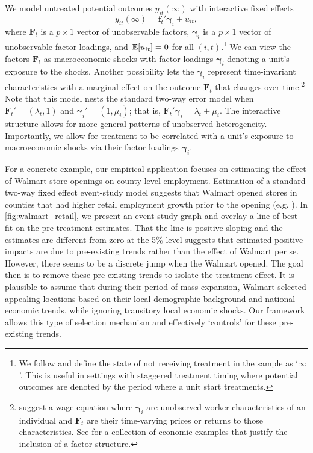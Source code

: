\documentclass[12pt]{article}
\begin{document}
We model untreated potential outcomes $y_{it}(\infty)$ with interactive fixed effects
\begin{equation}\label{eq:untreated_po}
    y_{it}(\infty) = \bm{f}_t' \bm{\gamma}_i + u_{it},
\end{equation}
where $\bm{F}_t$ is a $p \times 1$ vector of unobservable factors, $\bm \gamma_i$ is a $p \times 1$ vector of unobservable factor loadings, and $\expec{u_{it}} = 0$ for all $(i,t)$.\footnote{We follow \citet{Callaway_Santanna_2021} and define the state of not receiving treatment in the sample as `$\infty$'. This is useful in settings with staggered treatment timing where potential outcomes are denoted by the period where a unit start treatments.} We can view the factors $\bm{F}_t$ as macroeconomic shocks with factor loadings $\bm \gamma_i$ denoting a unit's exposure to the shocks. Another possibility lets the $\bm \gamma_i$ represent time-invariant characteristics with a marginal effect on the outcome $\bm{F}_t$ that changes over time.\footnote{\citet{Ahn_Lee_Schmidt_2013} suggest a wage equation where $\bm \gamma_i$ are unobserved worker characteristics of an individual and $\bm{F}_t$ are their time-varying prices or returns to those characteristics. See \citet{Bai_2009} for a collection of economic examples that justify the inclusion of a factor structure.} Note that this model nests the standard two-way error model when $\bm{F}_t' = (\lambda_t, 1)$ and $\bm \gamma_i' = (1, \mu_i)$; that is, $\bm{F}_t' \bm \gamma_i = \lambda_t + \mu_i$. The interactive structure allows for more general patterns of unobserved heterogeneity. Importantly, we allow for treatment to be correlated with a unit's exposure to macroeconomic shocks via their factor loadings $\bm{\gamma}_i$. 

For a concrete example, our empirical application focuses on estimating the effect of Walmart store openings on county-level employment. Estimation of a standard two-way fixed effect event-study model suggests that Walmart opened stores in counties that had higher retail employment growth prior to the opening (e.g. \citet{neumark2008effects}). In \autoref{fig:walmart_retail}, we present an event-study graph and overlay a line of best fit on the pre-treatment estimates. That the line is positive sloping and the estimates are different from zero at the 5\% level suggests that estimated positive impacts are due to pre-existing trends rather than the effect of Walmart per se. However, there seems to be a discrete jump when the Walmart opened. The goal then is to remove these pre-existing trends to isolate the treatment effect. It is plausible to assume that during their period of mass expansion, Walmart selected appealing locations based on their local demographic background and national economic trends, while ignoring transitory local economic shocks. Our framework allows this type of selection mechanism and effectively `controls' for these pre-existing trends.
\end{document}
